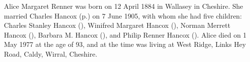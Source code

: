 
Alice Margaret Renner was born on 12 April 1884 in Wallasey in Cheshire.\cite{UKCensus1911_RG14_22074} She married Charles Hancox (p.\pageref{Charles_Edward_Hancox}) on 7 June 1905\cite{CheshireParishRegisters}, with whom she had five children: Charles Stanley Hancox (), Winifred Margaret Hancox (), Norman Merrett Hancox (), Barbara M. Hancox (), and Philip Renner Hancox (). 
Alice died on 1 May 1977 at the age of 93, and at the time was living at West Ridge, Links Hey Road, Caldy, Wirral, Cheshire. \cite{AMRennerDeath} 
